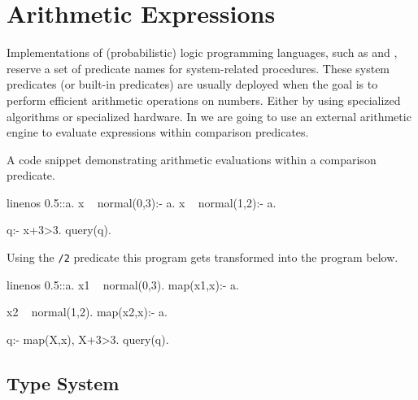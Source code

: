 







\section{Arithmetic Expressions}\label{sec:arithmetic}

Implementations of (probabilistic) logic programming languages, such as \prologsty and \problogsty, reserve a set of predicate names for system-related procedures. These system predicates (or built-in predicates) are usually deployed when the goal is to perform efficient arithmetic operations on numbers. Either by using specialized algorithms or specialized hardware. In \dcproblogsty we are going to use an external arithmetic engine to evaluate expressions within comparison predicates.

\begin{example}\label{ex:eval_comp} A \dcproblogsty code snippet demonstrating arithmetic evaluations within a comparison predicate.
	\begin{problog*}{linenos}
0.5::a.
x ~ normal(0,3):- a.
x ~ normal(1,2):- \+a.

q:- x+3>3.
query(q).
	\end{problog*}
Using the \lstinline[columns=fixed]|/2| predicate this program gets transformed into the program below.
	\begin{problog*}{linenos}
0.5::a.
x1 ~ normal(0,3).
map(x1,x):- a.

x2 ~ normal(1,2).
map(x2,x):- \+a.

q:- map(X,x), X+3>3.
query(q).
	\end{problog*}

\end{example}






\subsection{Type System} \label{sec:type_system}

